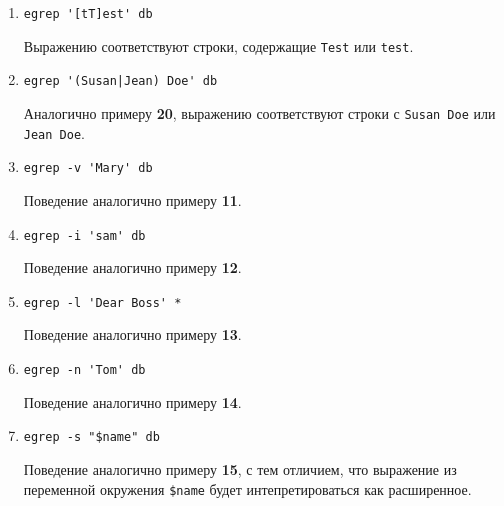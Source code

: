 \documentclass[listings]{labreport}
\begin{document}
\begin{enumerate}
\item \verb|egrep '[tT]est' db|

Выражению соответствуют строки, содержащие \texttt{Test} или \texttt{test}.

\item \verb=egrep '(Susan|Jean) Doe' db=

Аналогично примеру \textbf{20}, выражению соответствуют строки с
\texttt{Susan Doe} или \texttt{Jean Doe}.

\item \verb|egrep -v 'Mary' db|

Поведение аналогично примеру \textbf{11}.

\item \verb|egrep -i 'sam' db|

Поведение аналогично примеру \textbf{12}.

\item \verb|egrep -l 'Dear Boss' *|

Поведение аналогично примеру \textbf{13}.

\item \verb|egrep -n 'Tom' db|

Поведение аналогично примеру \textbf{14}.

\item \verb|egrep -s "$name" db|

Поведение аналогично примеру \textbf{15}, с тем отличием, что выражение
из переменной окружения \verb|$name| будет интепретироваться как
расширенное.
 
\end{enumerate}
\end{document}
